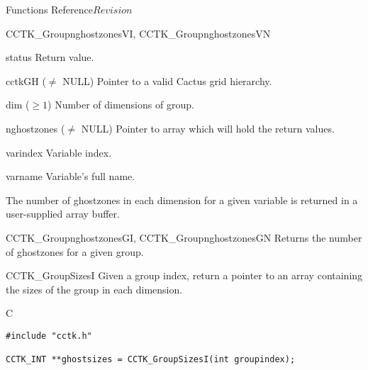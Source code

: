 \begin{cactuspart}{ Functions Reference}{}{$Revision$}
\begin{FunctionDescription}{CCTK\_GroupnghostzonesVI, CCTK\_GroupnghostzonesVN}
\begin{ParameterSection}
\begin{Parameter}{status} Return value. \end{Parameter}
\begin{Parameter}{cctkGH ($\ne$ NULL)} Pointer to a valid Cactus grid hierarchy. \end{Parameter}
\begin{Parameter}{dim ($\ge 1$)} Number of dimensions of group. \end{Parameter}
\begin{Parameter}{nghostzones ($\ne$ NULL)} Pointer to array which will hold the return values. \end{Parameter}
\begin{Parameter}{varindex} Variable index. \end{Parameter}
\begin{Parameter}{varname} Variable's full name. \end{Parameter}
\end{ParameterSection}

\begin{Discussion}
The number of ghostzones in each dimension for a given variable is returned in a user-supplied array buffer.
\end{Discussion}

\begin{SeeAlsoSection}
\begin{SeeAlso}{CCTK\_GroupnghostzonesGI, CCTK\_GroupnghostzonesGN}
Returns the number of ghostzones for a given group.
\end{SeeAlso}
\end{SeeAlsoSection}
\end{FunctionDescription}


\begin{FunctionDescription}{CCTK\_GroupSizesI}
\label{CCTK-GroupSizesI}
Given a group index, return a pointer to an array containing the sizes of the group in each dimension.

\begin{SynopsisSection}
\begin{Synopsis}{C}
\begin{verbatim}
#include "cctk.h"

CCTK_INT **ghostsizes = CCTK_GroupSizesI(int groupindex);
\end{verbatim}
\end{Synopsis}
\end{SynopsisSection}


\end{FunctionDescription}
\end{cactuspart}
